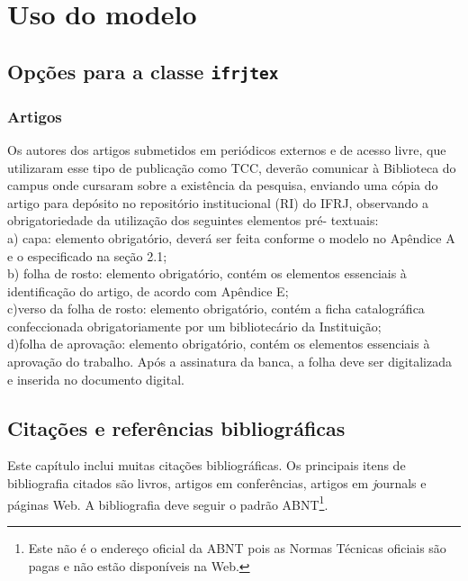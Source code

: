%
%
\chapter{Uso do modelo}

\section{Opções para a classe \texttt{ifrjtex}}

\subsection{Artigos}


\begin{citacao}
Os autores dos artigos submetidos em periódicos externos e de acesso livre, que utilizaram esse tipo de publicação como TCC, deverão comunicar à
Biblioteca do campus onde cursaram sobre a existência da pesquisa, enviando uma cópia do artigo para depósito no repositório institucional (RI) do IFRJ, observando a obrigatoriedade da utilização dos seguintes elementos pré- textuais:\\
    a) capa: elemento obrigatório, deverá ser feita conforme o modelo no Apêndice A e o especificado na seção 2.1;\\
    b) folha de rosto: elemento obrigatório, contém os elementos essenciais à identificação do artigo, de acordo com Apêndice E;\\
   c)verso da folha de rosto: elemento obrigatório, contém a ficha catalográfica confeccionada obrigatoriamente por um bibliotecário da Instituição;\\
    d)folha de aprovação: elemento obrigatório, contém os elementos essenciais à aprovação do trabalho. Após a assinatura da banca, a folha deve ser digitalizada e inserida no documento digital. \cite{ifrjtccs}
\end{citacao}


\section{Citações e referências bibliográficas}

Este capítulo inclui muitas citações bibliográficas. Os principais
itens de bibliografia citados são livros, artigos em conferências,
artigos em {\textit journals} e páginas Web. A bibliografia deve seguir o
padrão ABNT\footnote{Este não é o endereço oficial da
ABNT pois as Normas Técnicas oficiais são pagas e não estão disponíveis na Web.}.

